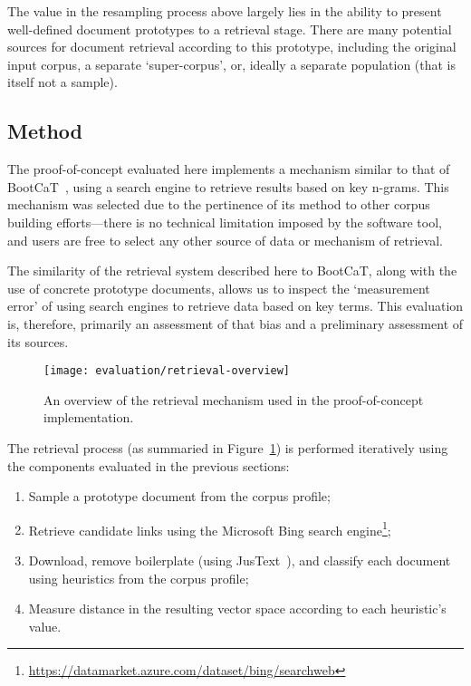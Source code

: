 The value in the resampling process above largely lies in the ability to present well-defined document prototypes to a retrieval stage.  There are many potential sources for document retrieval according to this prototype, including the original input corpus, a separate `super-corpus', or, ideally a separate population (that is itself not a sample).



\subsection{Method}
\label{sec:evaluation:method}

The proof-of-concept evaluated here implements a mechanism similar to that of BootCaT~\cite{baroni2004bootcat}, using a search engine to retrieve results based on key n-grams.  This mechanism was selected due to the pertinence of its method to other corpus building efforts---there is no technical limitation imposed by the software tool, and users are free to select any other source of data or mechanism of retrieval.

The similarity of the retrieval system described here to BootCaT, along with the use of concrete prototype documents, allows us to inspect the `measurement error' of using search engines to retrieve data based on key terms.  This evaluation is, therefore, primarily an assessment of that bias and a preliminary assessment of its sources.


\begin{figure}[Ht]
    \centering
    \texttt{[image: evaluation/retrieval-overview]}
    \caption{An overview of the retrieval mechanism used in the proof-of-concept implementation.}
\label{fig:evaluation:retrieval:outline}
\end{figure}


The retrieval process (as summaried in Figure~\ref{fig:evaluation:retrieval:outline}) is performed iteratively using the components evaluated in the previous sections:

\begin{enumerate}
    \item Sample a prototype document from the corpus profile;
    \item Retrieve candidate links using the Microsoft Bing search engine\footnote{\url{https://datamarket.azure.com/dataset/bing/searchweb}};
    \item Download, remove boilerplate (using JusText~\cite{pomikalek2013justext}), and classify each document using heuristics from the corpus profile;
    \item Measure distance in the resulting vector space according to each heuristic's value.
\end{enumerate}

